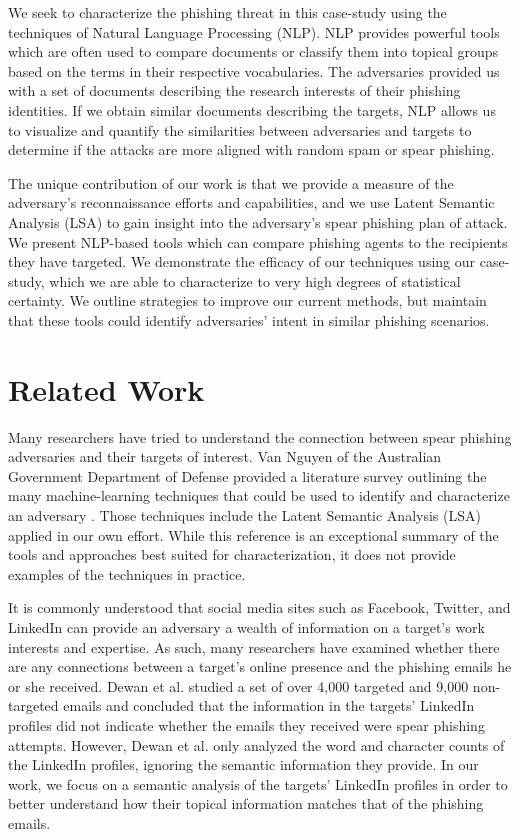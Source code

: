 \documentclass[conference]{IEEEtran}
\begin{document}
We seek to characterize the phishing threat in this case-study using the techniques of Natural Language Processing (NLP).  NLP provides powerful tools which are often used to compare documents or classify them into topical groups based on 
the terms in their respective vocabularies.  The adversaries provided us with a set of documents describing the research interests of their phishing identities.  If we obtain similar documents describing 
the targets, NLP allows us to visualize and quantify the similarities between adversaries and targets to determine if the attacks are more aligned with random spam or spear phishing.

The unique contribution of our work is that we provide a measure of the adversary's reconnaissance efforts and capabilities, and we use Latent Semantic 
Analysis (LSA) to gain insight into the adversary's spear phishing plan of attack.  We present NLP-based tools which can compare phishing agents to the recipients they have targeted.  We demonstrate the efficacy of our techniques using our case-study, which we are able to characterize to very high degrees of statistical certainty.  We outline strategies to improve our current methods, but maintain that these tools could identify 
adversaries' intent in similar phishing scenarios.





\section{Related Work}
Many researchers have tried to understand the connection between spear phishing adversaries and their targets of interest.  Van Nguyen of the Australian Government Department of Defense provided a literature survey outlining the many 
machine-learning techniques that could be used to identify and characterize an adversary \cite{nguyen2013attribution}.  Those techniques include the Latent Semantic Analysis (LSA) applied in our own 
effort.  While this reference is an exceptional summary of the tools and approaches best suited for characterization, 
it does not provide examples of the techniques in practice.

It is commonly understood that social media sites such as Facebook, Twitter, and LinkedIn can provide an adversary a wealth of information on a target's 
work interests and expertise.  As such, many researchers have examined whether there are any connections between a target's online presence and the 
phishing emails he or she received.  Dewan et al. \cite{dewan2014analyzing} studied  a set of over 4,000 targeted and 9,000 non-targeted emails and concluded that the information in the targets' LinkedIn profiles did not indicate whether the emails they received were spear phishing attempts.  However, 
Dewan et al. only analyzed the word and character counts of the LinkedIn profiles, ignoring the semantic information they provide.  In our work, we focus 
on a semantic analysis of the targets' LinkedIn profiles in order to better understand how their topical information matches that of the phishing emails.
\end{document}
